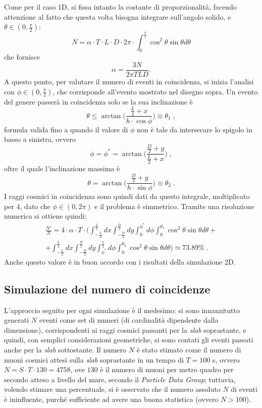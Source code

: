 Come per il caso 1D, si fissa intanto la costante di proporzionalità, facendo attenzione al fatto che questa volta bisogna integrare sull'angolo solido, e $\theta\in(0,\frac{\pi}{2})$: 
$$N = \alpha \cdot T \cdot L \cdot D \cdot 2\pi \cdot \int_{0}^{\frac{\pi}{2}} \cos^2\theta  \sin\theta d\theta$$
che fornisce 
$$\alpha = \frac{3N}{2\pi TLD}.$$ 
A questo punto, per valutare il numero di eventi in coincidenza, si inizia l'analisi con $\phi\in(0, \frac{\pi}{2})$, che corrisponde all'evento mostrato nel disegno sopra. Un evento del genere passerà in coincidenza solo se la sua inclinazione è $$\theta \leq \arctan \bigg(\frac{\frac{L}{2}+x}{h\cdot \cos\phi}\bigg) \equiv \theta_1\;,$$ formula valida fino a quando il valore di $\phi$ non è tale da intersecare lo spigolo in basso a sinistra, ovvero $$\phi = \phi^{*} = \arctan \bigg(\frac{\frac{D}{2}+y}{\frac{L}{2}+x}\bigg)\;,$$ oltre il quale l'inclinazione massima è $$\theta = \arctan \bigg(\frac{\frac{D}{2}+y}{h\cdot \sin\phi}\bigg)  \equiv \theta_2\;.$$I raggi cosmici in coincidenza sono quindi dati da questo integrale, moltiplicato per 4, dato che $\phi\in(0, 2\pi)$ e il problema è simmetrico. Tramite una risoluzione numerica si ottiene quindi:
\begin{multline*}
\frac{N'}{N}=4\cdot \alpha \cdot T\cdot \bigg( \int_{-\frac{L}{2}}^{\frac{L}{2}} dx \int_{-\frac{D}{2}}^{\frac{D}{2}} dy \int_0^{\phi^{*}} d\phi \int_0^{\theta_1} \cos^2\theta \sin\theta d\theta +\\
+ \int_{-\frac{L}{2}}^{\frac{L}{2}} dx \int_{-\frac{D}{2}}^{\frac{D}{2}} dy \int_{\phi^{*}}^{\frac{\pi}{2}} d\phi \int_0^{\theta_2} \cos^2\theta \sin\theta d\theta\bigg)\simeq 73.89 \%\;.
\end{multline*} 
Anche questo valore è in buon accordo con i risultati della simulazione 2D.

\subsection{Simulazione del numero di coincidenze}
L'approccio seguito per ogni simulazione è il medesimo: si sono innanzitutto generati $N$ eventi come set di numeri (di cardinalità dipendente dalla dimensione), corrispondenti ai raggi cosmici passanti per la \emph{slab} soprastante, e quindi, con semplici considerazioni geometriche, si sono contati gli eventi passati anche per la \emph{slab} sottostante. Il numero $N$ è stato stimato come il numero di muoni cosmici attesi sulla \emph{slab} soprastante in un tempo di $T=100$ s, ovvero $N=S\cdot T\cdot 130=4758$, ove $130$ è il numero di muoni per metro quadro per secondo atteso a livello del mare, secondo il \emph{Particle Data Group}; tuttavia, volendo stimare una percentuale, si è osservato che il numero assoluto $N$ di eventi è ininfluente, purché sufficiente ad avere una buona statistica (ovvero $N>100$).

